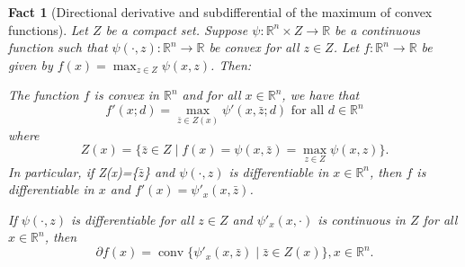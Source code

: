 \documentclass[smallextended,numbook,nospthms]{svjour3}
\theoremstyle{plain}
\newtheorem{fact}[theorem]{Fact}
\theoremstyle{definition}
\def\RR{\mathds R}
\begin{document}
\begin{fact}[Directional derivative and subdifferential of the maximum of convex functions]
	Let $Z$ be a compact set. Suppose $\psi:\RR^n \times Z \rightarrow \RR$ be a continuous function such that $\psi(\cdot,z):\RR^n \rightarrow \RR$ be convex for all $z \in Z$. Let $f:\RR^n \rightarrow \RR$ be given by $f(x)= \max_{z \in Z} \psi(x,z)$. Then:
	\begin{listi}
		\item The function $f$ is convex in $\RR^n$ and for all $x \in \RR^n$, we have that
		\[
		f'(x;d)=\max_{\bar{z} \in Z(x)} \psi'(x,\bar{z};d) \text{ for all } d \in \RR^n
		\]
		where
		\[
		Z(x)=\{\bar{z} \in Z \mid f(x)=\psi(x,\bar{z})=\max_{z \in Z} \psi(x,z)\}.
		\]
		In particular, if Z(x)=\{$\bar{z}$\} and $\psi(\cdot,z)$ is differentiable in $x \in \RR^n$, then $f$ is differentiable in $x$ and $f'(x)=\psi'_{x}(x,\bar{z})$.
		\item If $\psi(\cdot,z)$ is differentiable for all $z \in Z$ and $\psi'_{x}(x,\cdot)$ is continuous in $Z$ for all $x \in \RR^n$, then
		\[
		\partial f(x)=\operatorname{conv}\{\psi'_{x}(x,\bar{z}) \mid \bar{z} \in Z(x)\}, x \in \RR^n.
		\]
	\end{listi}
\end{fact}
\end{document}
